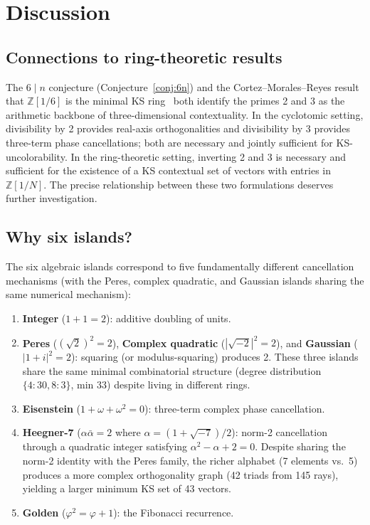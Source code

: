 \documentclass[12pt,a4paper]{article}
\newcommand{\Z}{\mathbb{Z}}
\begin{document}
\section{Discussion}\label{sec:discussion}

\subsection{Connections to ring-theoretic results}

The $6 \mid n$ conjecture (Conjecture~\ref{conj:6n}) and the Cortez--Morales--Reyes result that $\Z[1/6]$ is the minimal KS ring~\cite{CortezMoralesReyes2022} both identify the primes 2 and 3 as the arithmetic backbone of three-dimensional contextuality. In the cyclotomic setting, divisibility by 2 provides real-axis orthogonalities and divisibility by 3 provides three-term phase cancellations; both are necessary and jointly sufficient for KS-uncolorability. In the ring-theoretic setting, inverting 2 and 3 is necessary and sufficient for the existence of a KS contextual set of vectors with entries in $\Z[1/N]$. The precise relationship between these two formulations deserves further investigation.

\subsection{Why six islands?}

The six algebraic islands correspond to five fundamentally different cancellation mechanisms (with the Peres, complex quadratic, and Gaussian islands sharing the same numerical mechanism):

\begin{enumerate}
    \item \textbf{Integer} ($1 + 1 = 2$): additive doubling of units.
    \item \textbf{Peres} ($(\sqrt{2})^2 = 2$), \textbf{Complex quadratic} ($|\sqrt{-2}|^2 = 2$), and \textbf{Gaussian} ($|1+i|^2 = 2$): squaring (or modulus-squaring) produces 2. These three islands share the same minimal combinatorial structure (degree distribution $\{4{:}30, 8{:}3\}$, min 33) despite living in different rings.
    \item \textbf{Eisenstein} ($1 + \omega + \omega^2 = 0$): three-term complex phase cancellation.
    \item \textbf{Heegner-7} ($\alpha\bar\alpha = 2$ where $\alpha = (1+\sqrt{-7})/2$): norm-2 cancellation through a quadratic integer satisfying $\alpha^2 - \alpha + 2 = 0$. Despite sharing the norm-2 identity with the Peres family, the richer alphabet (7 elements vs.\ 5) produces a more complex orthogonality graph (42 triads from 145 rays), yielding a larger minimum KS set of 43 vectors.
    \item \textbf{Golden} ($\varphi^2 = \varphi + 1$): the Fibonacci recurrence.
\end{enumerate}
\end{document}
